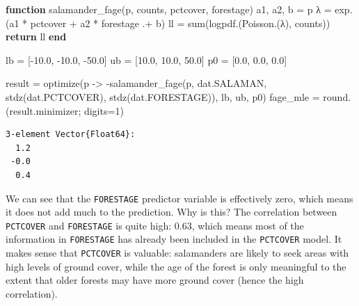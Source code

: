 \documentclass[
  letterpaper,
  DIV=11,
  numbers=noendperiod]{scrartcl}
\newenvironment{Shaded}{\begin{snugshade}}{\end{snugshade}}
\newcommand{\ControlFlowTok}[1]{\textcolor[rgb]{0.00,0.23,0.31}{\textbf{#1}}}
\newcommand{\FloatTok}[1]{\textcolor[rgb]{0.68,0.00,0.00}{#1}}
\newcommand{\FunctionTok}[1]{\textcolor[rgb]{0.28,0.35,0.67}{#1}}
\newcommand{\KeywordTok}[1]{\textcolor[rgb]{0.00,0.23,0.31}{\textbf{#1}}}
\newcommand{\NormalTok}[1]{\textcolor[rgb]{0.00,0.23,0.31}{#1}}
\newcommand{\OperatorTok}[1]{\textcolor[rgb]{0.37,0.37,0.37}{#1}}
\begin{document}
\begin{Shaded}
\begin{Highlighting}[]
\KeywordTok{function} \FunctionTok{salamander\_fage}\NormalTok{(p, counts, pctcover, forestage) }
\NormalTok{    a1, a2, b }\OperatorTok{=}\NormalTok{ p}
\NormalTok{    λ }\OperatorTok{=} \FunctionTok{exp}\NormalTok{.(a1 }\OperatorTok{*}\NormalTok{ pctcover }\OperatorTok{+}\NormalTok{ a2 }\OperatorTok{*}\NormalTok{ forestage }\OperatorTok{.+}\NormalTok{ b)}
\NormalTok{    ll }\OperatorTok{=} \FunctionTok{sum}\NormalTok{(}\FunctionTok{logpdf}\NormalTok{.(}\FunctionTok{Poisson}\NormalTok{.(λ), counts))}
    \ControlFlowTok{return}\NormalTok{ ll}
\KeywordTok{end}

\NormalTok{lb }\OperatorTok{=}\NormalTok{ [}\OperatorTok{{-}}\FloatTok{10.0}\NormalTok{, }\OperatorTok{{-}}\FloatTok{10.0}\NormalTok{, }\OperatorTok{{-}}\FloatTok{50.0}\NormalTok{]}
\NormalTok{ub }\OperatorTok{=}\NormalTok{ [}\FloatTok{10.0}\NormalTok{, }\FloatTok{10.0}\NormalTok{, }\FloatTok{50.0}\NormalTok{]}
\NormalTok{p0 }\OperatorTok{=}\NormalTok{ [}\FloatTok{0.0}\NormalTok{, }\FloatTok{0.0}\NormalTok{, }\FloatTok{0.0}\NormalTok{]}

\NormalTok{result }\OperatorTok{=} \FunctionTok{optimize}\NormalTok{(p }\OperatorTok{{-}\textgreater{}} \FunctionTok{{-}salamander\_fage}\NormalTok{(p, dat.SALAMAN, }\FunctionTok{stdz}\NormalTok{(dat.PCTCOVER), }\FunctionTok{stdz}\NormalTok{(dat.FORESTAGE)), lb, ub, p0)}
\NormalTok{fage\_mle }\OperatorTok{=} \FunctionTok{round}\NormalTok{.(result.minimizer; digits}\OperatorTok{=}\FloatTok{1}\NormalTok{)}
\end{Highlighting}
\end{Shaded}

\begin{verbatim}
3-element Vector{Float64}:
  1.2
 -0.0
  0.4
\end{verbatim}

We can see that the \texttt{FORESTAGE} predictor variable is effectively
zero, which means it does not add much to the prediction. Why is this?
The correlation between \texttt{PCTCOVER} and \texttt{FORESTAGE} is
quite high: 0.63, which means most of the information in
\texttt{FORESTAGE} has already been included in the \texttt{PCTCOVER}
model. It makes sense that \texttt{PCTCOVER} is valuable: salamanders
are likely to seek areas with high levels of ground cover, while the age
of the forest is only meaningful to the extent that older forests may
have more ground cover (hence the high correlation).
\end{document}
